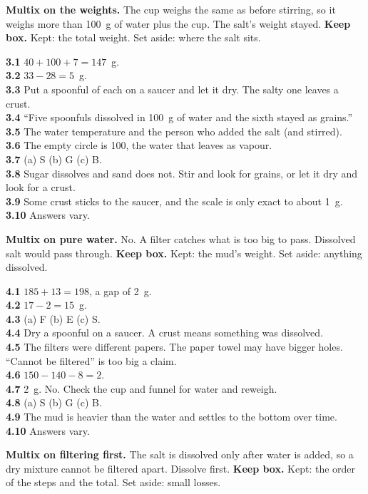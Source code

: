 \textbf{Multix on the weights.} The cup weighs the same as before stirring, so it weighs more than 100~g of water plus the cup. The salt's weight stayed. \textbf{Keep box.} Kept: the total weight. Set aside: where the salt sits.

\textbf{3.1} $40+100+7=147$~g.\\
\textbf{3.2} $33-28=5$~g.\\
\textbf{3.3} Put a spoonful of each on a saucer and let it dry. The salty one leaves a crust.\\
\textbf{3.4} ``Five spoonfuls dissolved in 100~g of water and the sixth stayed as grains.''\\
\textbf{3.5} The water temperature and the person who added the salt (and stirred).\\
\textbf{3.6} The empty circle is 100, the water that leaves as vapour.\\
\textbf{3.7} (a) S (b) G (c) B.\\
\textbf{3.8} Sugar dissolves and sand does not. Stir and look for grains, or let it dry and look for a crust.\\
\textbf{3.9} Some crust sticks to the saucer, and the scale is only exact to about 1~g.\\
\textbf{3.10} Answers vary.

\textbf{Multix on pure water.} No. A filter catches what is too big to pass. Dissolved salt would pass through. \textbf{Keep box.} Kept: the mud's weight. Set aside: anything dissolved.

\textbf{4.1} $185+13=198$, a gap of 2~g.\\
\textbf{4.2} $17-2=15$~g.\\
\textbf{4.3} (a) F (b) E (c) S.\\
\textbf{4.4} Dry a spoonful on a saucer. A crust means something was dissolved.\\
\textbf{4.5} The filters were different papers. The paper towel may have bigger holes. ``Cannot be filtered'' is too big a claim.\\
\textbf{4.6} $150-140-8=2$.\\
\textbf{4.7} 2~g. No. Check the cup and funnel for water and reweigh.\\
\textbf{4.8} (a) S (b) G (c) B.\\
\textbf{4.9} The mud is heavier than the water and settles to the bottom over time.\\
\textbf{4.10} Answers vary.

\textbf{Multix on filtering first.} The salt is dissolved only after water is added, so a dry mixture cannot be filtered apart. Dissolve first. \textbf{Keep box.} Kept: the order of the steps and the total. Set aside: small losses.

